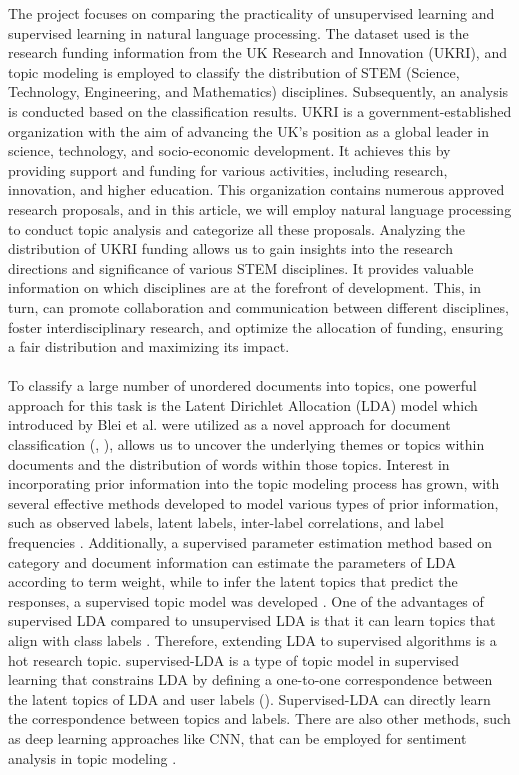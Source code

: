 \documentclass[12pt,twoside]{article}
\begin{document}
The project focuses on comparing the practicality of unsupervised learning and supervised learning in natural language processing. The dataset used is the research funding information from the UK Research and Innovation (UKRI), and topic modeling is employed to classify the distribution of STEM (Science, Technology, Engineering, and Mathematics) disciplines. Subsequently, an analysis is conducted based on the classification results. UKRI is a government-established organization with the aim of advancing the UK's position as a global leader in science, technology, and socio-economic development. It achieves this by providing support and funding for various activities, including research, innovation, and higher education. This organization contains numerous approved research proposals, and in this article, we will employ natural language processing to conduct topic analysis and categorize all these proposals. Analyzing the distribution of UKRI funding allows us to gain insights into the research directions and significance of various STEM disciplines. It provides valuable information on which disciplines are at the forefront of development. This, in turn, can promote collaboration and communication between different disciplines, foster interdisciplinary research, and optimize the allocation of funding, ensuring a fair distribution and maximizing its impact.\\\\

To classify a large number of unordered documents into topics, one powerful approach for this task is the Latent Dirichlet Allocation (LDA) model which introduced by Blei et al. were utilized as a novel approach for document classification (\cite{blei2003latent}, \cite{blei2012probabilistic}), allows us to uncover the underlying themes or topics within documents and the distribution of words within those topics. Interest in incorporating prior information into the topic modeling process has grown, with several effective methods developed to model various types of prior information, such as observed labels, latent labels, inter-label correlations, and label frequencies \cite{Wang:2020aa}. Additionally, a supervised parameter estimation method based on category and document information can estimate the parameters of LDA according to term weight, while to infer the latent topics that predict the responses, a supervised topic model was developed \cite{Liu2015}. One of the advantages of supervised LDA compared to unsupervised LDA is that it can learn topics that align with class labels \cite{Lakshminarayanan2011}. Therefore, extending LDA to supervised algorithms is a hot research topic. supervised-LDA is a type of topic model in supervised learning that constrains LDA by defining a one-to-one correspondence between the latent topics of LDA and user labels (\cite{ramage2009labeled}). Supervised-LDA can directly learn the correspondence between topics and labels. There are also other methods, such as deep learning approaches like CNN, that can be employed for sentiment analysis in topic modeling \cite{Mohammed:2019aa} \cite{Ombabi:2020aa}.\\\\
\end{document}
